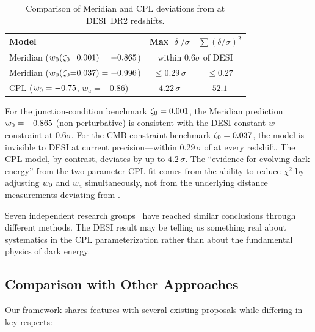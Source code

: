 \begin{table}[h]
\centering
\caption{Comparison of Meridian and CPL deviations from \LCDM{} at DESI~DR2 redshifts.}
\label{tab:1-desi-comparison}
\begin{tabular}{@{}lcc@{}}
\toprule
Model & Max $|\delta|/\sigma$ & $\sum(\delta/\sigma)^2$ \\
\midrule
Meridian ($w_0(\zeta_0{=}0.001) = -0.865$) & \multicolumn{2}{c}{within $0.6\sigma$ of DESI} \\
Meridian ($w_0(\zeta_0{=}0.037) = -0.996$) & $\leq 0.29\,\sigma$ & $\leq 0.27$ \\
CPL ($w_0 = -0.75$, $w_a = -0.86$) & $4.22\,\sigma$ & $52.1$ \\
\bottomrule
\end{tabular}
\end{table}

For the junction-condition benchmark $\zeta_0 = 0.001$, the Meridian prediction $w_0 = -0.865$ (non-perturbative) is consistent with the DESI constant-$w$ constraint at $0.6\sigma$. For the CMB-constraint benchmark $\zeta_0 = 0.037$, the model is invisible to DESI at current precision---within $0.29\,\sigma$ of \LCDM{} at every redshift. The CPL model, by contrast, deviates by up to $4.2\,\sigma$. The ``evidence for evolving dark energy'' from the two-parameter CPL fit comes from the ability to reduce $\chi^2$ by adjusting $w_0$ and $w_a$ simultaneously, not from the underlying distance measurements deviating from \LCDM.

Seven independent research groups~\cite{ch1:nesseris25,ch1:gomez25,ch1:lodha24,ch1:hasan25,ch1:mandal25,ch1:andrianomena25,ch1:marques25} have reached similar conclusions through different methods. The DESI result may be telling us something real about systematics in the CPL parameterization rather than about the fundamental physics of dark energy.

\subsection{Comparison with Other Approaches}
\label{sec:1-comparison}

Our framework shares features with several existing proposals while differing in key respects:

